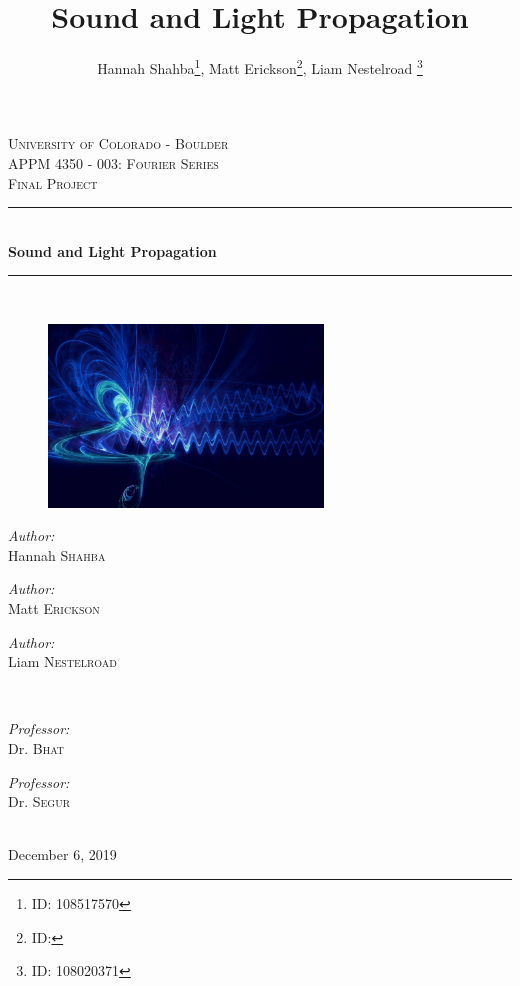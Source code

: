 \documentclass[conf]{new-aiaa}
\title{Sound and Light Propagation}
\author{Hannah Shahba\footnote{ID: 108517570}, Matt Erickson\footnote{ID: }, Liam Nestelroad \footnote{ID: 108020371}}
\begin{document}
\begin{titlepage}

\newcommand{\HRule}{\rule{\linewidth}{0.5mm}}

\center
 
\textsc{\LARGE University of Colorado - Boulder}\\[1.5cm]
\textsc{\Large APPM 4350 - 003: Fourier Series}\\[0.5cm] %
\textsc{\large Final Project}\\[0.5cm] %

\HRule \\[0.4cm]
{ \huge \bfseries Sound and Light Propagation}\\[0.4cm] 
\HRule \\[1.5cm]

\begin{figure}[H]
    \centering
    \includegraphics[width=0.65\textwidth]{timbre.jpg}
\end{figure}



\begin{minipage}{0.4\textwidth}
\begin{flushleft} \large
\emph{Author:}\\
Hannah \textsc{Shahba} 
\end{flushleft}
\begin{flushleft} \large
\emph{Author:}\\
Matt \textsc{Erickson} 
\end{flushleft}
\begin{flushleft} \large
\emph{Author:}\\
Liam \textsc{Nestelroad} 
\end{flushleft}
\end{minipage}
~
\begin{minipage}{0.4\textwidth}
\begin{flushright} \large
\emph{Professor:} \\
Dr. \textsc{Bhat} 
\end{flushright}
\begin{flushright} \large
\emph{Professor:} \\
Dr. \textsc{Segur} 
\end{flushright}
\end{minipage}\\[1cm]

{\large December 6, 2019}\\[2cm] 
 
\vfill

\end{titlepage}
\end{document}
